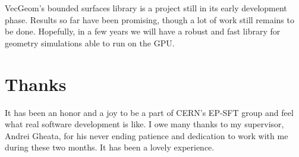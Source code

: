 \documentclass[12pt, a4paper]{article}
\begin{document}
 VecGeom's bounded surfaces library is a project still in its early development phase. Results so far have been promising, though a lot of work still remains to be done. Hopefully, in a few years we will have a robust and fast library for geometry simulations able to run on the GPU. 


\section*{Thanks}

It has been an honor and a joy to be a part of CERN's EP-SFT group and feel what real software development is like. I owe many thanks to my supervisor, Andrei Gheata, for his never ending patience and dedication to work with me during these two months. It has been a lovely experience.
\end{document}
